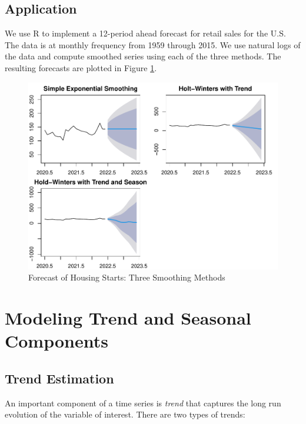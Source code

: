 \documentclass[]{book}
\theoremstyle{definition}
\theoremstyle{definition}
\theoremstyle{definition}
\theoremstyle{remark}
\begin{document}
\hypertarget{application}{%
\section{Application}\label{application}}

We use R to implement a 12-period ahead forecast for retail sales for
the U.S. The data is at monthly frequency from 1959 through 2015. We use
natural logs of the data and compute smoothed series using each of the
three methods. The resulting forecasts are plotted in Figure
\ref{fig:ch4-figure1}.

\begin{figure}

{\centering \includegraphics[width=0.8\linewidth]{bookdown-demo_files/figure-latex/ch4-figure1-1} 

}

\caption{Forecast of Housing Starts: Three Smoothing Methods}\label{fig:ch4-figure1}
\end{figure}

\hypertarget{modeling-trend-and-seasonal-components}{%
\chapter{Modeling Trend and Seasonal
Components}\label{modeling-trend-and-seasonal-components}}

\hypertarget{trend-estimation}{%
\section{Trend Estimation}\label{trend-estimation}}

An important component of a time series is \emph{trend} that captures
the long run evolution of the variable of interest. There are two types
of trends:
\end{document}
